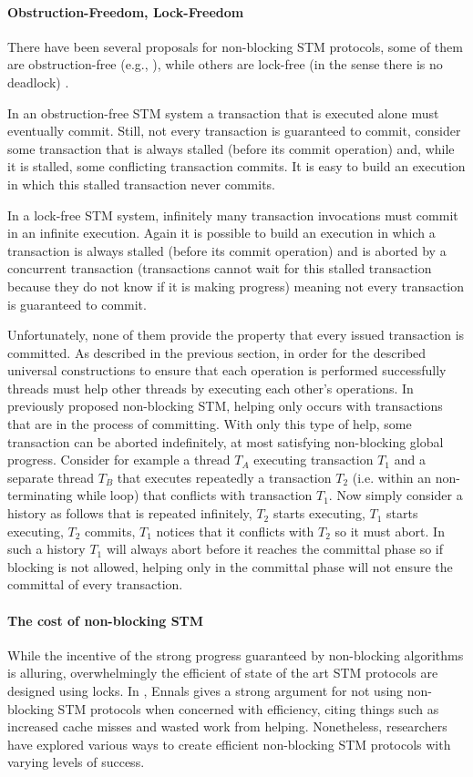 \paragraph{Obstruction-Freedom, Lock-Freedom} 
There have been several proposals for non-blocking STM protocols,
some of them  are obstruction-free  (e.g., \cite{HLMS03,ST97}),
while others are lock-free  (in the sense there is no deadlock) \cite{GHS08}.

In an obstruction-free STM system a transaction that is executed alone 
must eventually commit. Still, not every transaction is guaranteed to commit,
consider some transaction that is always 
stalled (before its commit operation) and, while it is stalled, 
some conflicting transaction commits. It is easy to build an execution 
in which this stalled transaction never commits.

In a lock-free STM system, infinitely many transaction invocations must 
commit   in  an infinite  execution.  Again it  is  possible  to build   an
execution in which a transaction is always stalled 
(before its commit operation) and is aborted by a concurrent transaction  
(transactions cannot wait for this stalled transaction because they do not 
know if it is making progress) meaning not every transaction is guaranteed to
commit.

Unfortunately, none of them  provide the property that every issued 
transaction is committed.
As described in the previous section,
in order for the described universal constructions to ensure that each operation
is performed successfully threads must help other threads by executing
each other's operations.
In previously proposed non-blocking STM, helping only occurs
with transactions that are in the process of committing.
With only this type of help,  some transaction 
can be aborted indefinitely, 
at most satisfying non-blocking global progress.
Consider for example a thread $T_A$ executing transaction $T_1$
and a separate thread $T_B$ that executes repeatedly a transaction $T_2$ (i.e. within
an non-terminating while loop) that conflicts with transaction $T_1$.
Now simply consider a history as follows that is repeated infinitely, $T_2$ starts executing,
$T_1$ starts executing, $T_2$ commits, $T_1$ notices that it conflicts with
$T_2$ so it must abort.
In such a history $T_1$ will always abort before it reaches the committal phase
so if blocking is not allowed, helping only in the committal phase will not
ensure the committal of every transaction.


\paragraph{The cost of non-blocking STM}
While the incentive of the strong progress guaranteed by non-blocking algorithms
is alluring, overwhelmingly the efficient of state of the art STM protocols are designed
using locks.
In \cite{Ennals05efficientsoftware}, Ennals gives a strong argument for not using non-blocking STM protocols
when concerned with efficiency, citing things such as increased cache misses and wasted
work from helping.
Nonetheless, researchers have explored various ways to create efficient non-blocking STM protocols \cite{FM11, MM08, MSHAESS06} with
varying levels of success.

